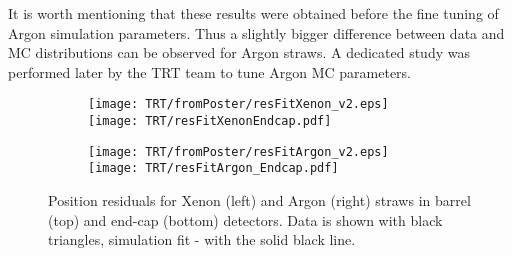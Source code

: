It is worth mentioning that these results were obtained before the fine tuning of Argon simulation parameters. Thus a slightly bigger difference between data and MC distributions can be observed for Argon straws. A dedicated study was performed later by the TRT team to tune Argon MC parameters.

\begin{figure}

\begin{subfigure}{.5\textwidth}
  \centering
  \texttt{[image: TRT/fromPoster/resFitXenon\_v2.eps]}
  \texttt{[image: TRT/resFitXenonEndcap.pdf]}
\end{subfigure}%
\begin{subfigure}{.5\textwidth}
  \centering
  \texttt{[image: TRT/fromPoster/resFitArgon\_v2.eps]}
  \texttt{[image: TRT/resFitArgon\_Endcap.pdf]}
\end{subfigure}

\caption{Position residuals for Xenon (left) and Argon (right) straws in barrel (top) and end-cap (bottom) detectors. Data is shown with black triangles, 
simulation fit - with the solid black line.}
  \label{fig:resFit}
\end{figure}


